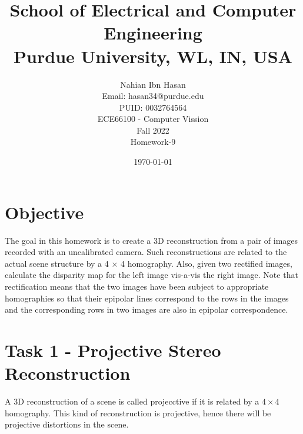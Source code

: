 \documentclass{article}
\title{School of Electrical and Computer Engineering\\
Purdue University, WL, IN, USA}
\author{Nahian Ibn Hasan\\
Email: hasan34@purdue.edu\\
PUID: 0032764564\\
ECE66100 - Computer Vission\\
Fall 2022\\
Homework-9}
\date{\today}
\begin{document}
\maketitle
\section{Objective}
The goal in this homework is to create a 3D reconstruction from a pair of images recorded with an uncalibrated camera. Such reconstructions are related to the actual scene structure by a 4 × 4 homography. Also, given two rectified images, calculate the disparity map for the left image vis-a-vis the right image. Note that rectification means that the two images have been subject to appropriate homographies so that their epipolar lines correspond to the rows in the images and the corresponding rows in two images are also in epipolar correspondence.
\section{Task 1 - Projective Stereo Reconstruction}
A 3D reconstruction of a scene is called projecctive if it is related by a $4\times 4$ homography. This kind of reconstruction is projective, hence there will be projective distortions in the scene. 
\end{document}
